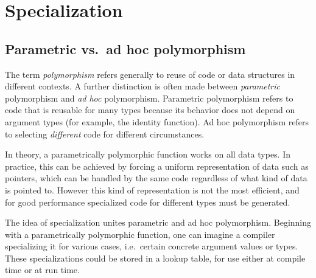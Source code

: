 

\section{Specialization}

\subsection{Parametric vs.\ ad hoc polymorphism}

The term \emph{polymorphism} refers generally to reuse of code or data
structures in different contexts.
A further distinction is often made between \emph{parametric} polymorphism
and \emph{ad hoc} polymorphism.
Parametric polymorphism refers to code that is reusable for many types
because its behavior does not depend on argument types (for example,
the identity function).
Ad hoc polymorphism refers to selecting
\emph{different} code for different circumstances.


In theory, a parametrically polymorphic function works on all data
types.
In practice, this can be achieved by forcing a uniform representation of
data such as pointers, which can be handled by the same code regardless of
what kind of data is pointed to.
However this kind of representation is not the most efficient, and
for good performance specialized code for different types must be
generated.

The idea of specialization unites parametric and ad hoc polymorphism.
Beginning with a parametrically polymorphic function, one can imagine
a compiler specializing it for various cases, i.e.\ certain concrete argument
values or types.
These specializations could be stored in a lookup table, for use
either at compile time or at run time.

